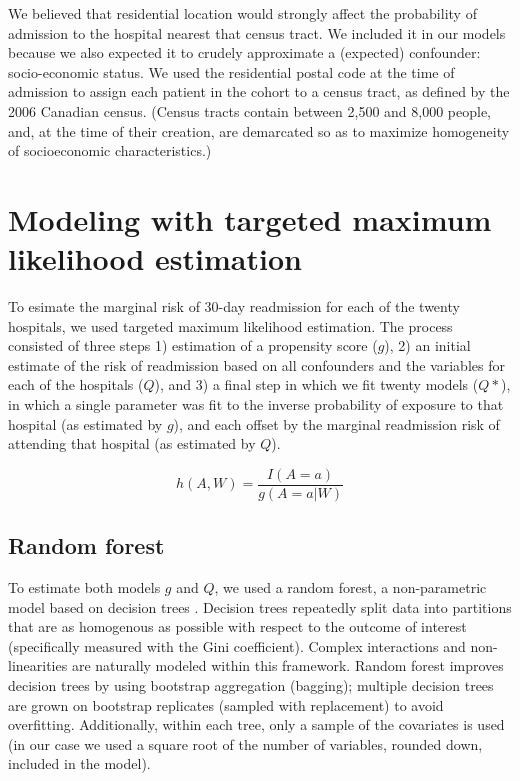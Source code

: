 \documentclass[]{article}\usepackage[]{graphicx}\usepackage[]{color}
\begin{document}
We believed that residential location would strongly affect the probability of admission to the hospital nearest that census tract. We included it in our models because we also expected it to crudely approximate a (expected) confounder: socio-economic status.  We used the residential postal code at the time of admission to assign each patient in the cohort to a census tract, as defined by the 2006 Canadian census. (Census tracts contain between 2,500 and 8,000 people, and, at the time of their creation, are demarcated so as to maximize homogeneity of socioeconomic characteristics.)

\section{Modeling with targeted maximum likelihood estimation}
To esimate the marginal risk of 30-day readmission for each of the twenty hospitals, we used targeted maximum likelihood estimation. The process consisted of three steps 1) estimation of a propensity score ($g$), 2) an initial estimate of the risk of readmission based on all confounders and the variables for each of the hospitals ($Q$), and 3) a final step in which we fit twenty models ($Q*$), in which a single parameter was fit to the inverse probability of exposure to that hospital (as estimated by $g$), and each offset by the marginal readmission risk of attending that hospital (as estimated by $Q$). 

\begin{equation}
\label{logistic_clever_covariate} 
h(A,W)=\frac{I(A=a)}{g(A=a|W)}
\end{equation}

\subsection{Random forest}
To estimate both models $g$ and $Q$, we used a random forest, a non-parametric model based on decision trees \supercite{breiman_random_2001}. Decision trees repeatedly split data into partitions that are as homogenous as possible with respect to the outcome of interest (specifically measured with the Gini coefficient\supercite{gini_variabilita_1912}). Complex interactions and non-linearities are naturally modeled within this framework. Random forest improves decision trees by using bootstrap aggregation (bagging); multiple decision trees are grown on bootstrap replicates (sampled with replacement) to avoid overfitting. Additionally, within each tree, only a sample of the covariates is used (in our case we used a square root of the number of variables, rounded down, included in the model).
\end{document}
